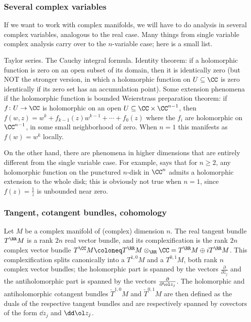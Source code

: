 \documentclass[10pt]{article}
\begin{document}
\subsubsection{Several complex variables}
If we want to work with complex manifolds, we will have to do
analysis in several complex variables, analogous to the real case.
Many things from single variable complex analysis carry over
to the $n$-variable case; here is a small list.
\begin{itemize}
    \ii Taylor series.
    \ii The Cauchy integral formula.
    \ii Identity theorem: if a holomorphic function
    is zero on an open subset of its domain, then it is identically zero
    (but NOT the stronger version, in which
    a holomorphic function on $U\subseteq\CC$ is zero identically
    if its zero set has an accumulation point).
    \ii Some extension phenomena if the holomorphic function is bounded
    \ii Weierstrass preparation theorem:
    if $f\colon U\to\CC$ is holomorphic on an open
    $U\subseteq\CC\times\CC^{n-1}$,
    then $f(w,z) = w^k + f_{k-1}(z)w^{k-1} + \cdots + f_0(z)$
    where the $f_i$ are holomorphic on $\CC^{n-1}$,
    in some small neighborhood of zero.
    When $n=1$ this manifests as $f(w) = w^k$ locally.
\end{itemize}

On the other hand, there are phenomena in higher dimensions
that are entirely different from the single variable case.
For example,  says that
for $n\ge 2$, any holomorphic function on the punctured $n$-disk in $\CC^n$
admits a holomorphic extension to the whole disk;
this is obviously not true when $n = 1$, since $f(z) = \frac 1z$
is unbounded near zero.

\subsubsection{Tangent, cotangent bundles, cohomology}

Let $M$ be a complex manifold of (complex) dimension $n$.
The real tangent bundle $T^\RR M$ is a rank $2n$ real vector bundle,
and its complexification is the rank $2n$ complex vector bundle
$T^\CC M \coloneq T^\RR M\otimes_\RR \CC = T^\RR M\oplus i T^\RR M$.
This complexification splits canonically
into a  $T^{1,0}M$
and a  $T^{0,1}M$,
both rank $n$ complex vector bundles;
the holomorphic part is spanned by the vectors
$\frac\partial{\partial z_j}$
and the antiholomorphic part is spanned by the vectors
$\frac\partial{\partial\ol z_j}$.
The holomorphic and antiholomorphic cotangent bundles
$\check T^{1,0}M$ and $\check T^{0,1}M$
are then defined as the duals of the respective tangent bundles
and are respectively spanned by covectors of the form
$\dd z_j$ and $\dd\ol z_j$.
\end{document}
